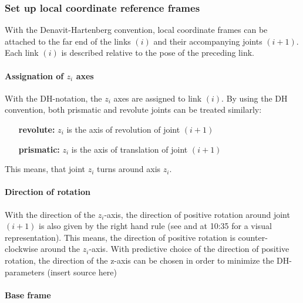 \subsubsection{Set up local coordinate reference frames} \label{sec:localRefFrame}
With the Denavit-Hartenberg convention, local coordinate frames can be attached to the far end of the links $ (i) $ and their accompanying joints $ (i+1) $.
Each link $(i)$ is described relative to the pose of the preceding link.



\paragraph{Assignation of $z_i$ axes}\label{par:z_iAxesAssign}

With the DH-notation, the $z_i$ axes are assigned to link $(i)$. 
By using the  DH convention, both prismatic and revolute joints can be treated similarly: %
\begin{itemize}[wide=\parindent]
	\item[\textbf{revolute:}] $z_i$ is the axis of revolution of joint $(i+1)$
	\item[\textbf{prismatic:}] $z_i$ is the axis of translation of joint $(i+1)$
\end{itemize}
This means, that joint $z_i$ turns around axis $z_i$.

\paragraph{Direction of rotation}
With the direction of the $z_i$-axis, the direction of positive rotation around joint $(i+1)$ is also given by the right hand rule (see \cite{RightHandRule} and \cite{Angela_U1S2P1} at 10:35 for a visual representation). This means, the direction of positive rotation is counter-clockwise around the $z_i$-axis.
With predictive choice of the direction of positive rotation, the direction of the z-axis can be chosen in order to minimize the DH-parameters (insert source here)



\paragraph{Base frame}


